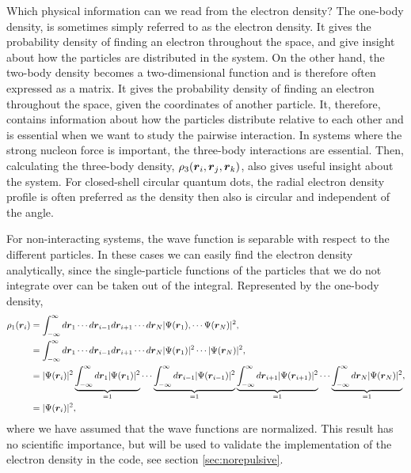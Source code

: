 Which physical information can we read from the electron density? The one-body density, is sometimes simply referred to as the electron density. It gives the probability density of finding an electron throughout the space, and give insight about how the particles are distributed in the system. On the other hand, the two-body density becomes a two-dimensional function and is therefore often expressed as a matrix. It gives the probability density of finding an electron throughout the space, given the coordinates of another particle. It, therefore, contains information about how the particles distribute relative to each other and is essential when we want to study the pairwise interaction. In systems where the strong nucleon force is important, the three-body interactions are essential. Then, calculating the three-body density, $\rho_3(\boldsymbol{{r}}_i, \boldsymbol{{r}}_j, \boldsymbol{{r}}_k)$, also gives useful insight about the system. For closed-shell circular quantum dots, the radial electron density profile is often preferred as the density then also is circular and independent of the angle. 

For non-interacting systems, the wave function is separable with respect to the different particles. In these cases we can easily find the electron density analytically, since the single-particle functions of the particles that we do not integrate over can be taken out of the integral. Represented by the one-body density, 
\begin{equation}
\begin{aligned}
\rho_1(\boldsymbol{{r}}_i)&=\int_{-\infty}^{\infty}d\boldsymbol{{r}}_{1}\cdots d\boldsymbol{{r}}_{i-1}d\boldsymbol{{r}}_{i+1}\cdots d\boldsymbol{{r}}_N |\Psi(\boldsymbol{{r}}_1),\cdots \Psi(\boldsymbol{{r}}_N)|^2,\\
&=\int_{-\infty}^{\infty}d\boldsymbol{{r}}_{1}\cdots d\boldsymbol{{r}}_{i-1}d\boldsymbol{{r}}_{i+1}\cdots d\boldsymbol{{r}}_N |\Psi(\boldsymbol{{r}}_1)|^2\cdots |\Psi(\boldsymbol{{r}}_N)|^2,\\
&=|\Psi(\boldsymbol{{r}}_i)|^2\underbrace{\int_{-\infty}^{\infty}d\boldsymbol{{r}}_{1}|\Psi(\boldsymbol{{r}}_{1})|^2}_{=1}\cdots\underbrace{\int_{-\infty}^{\infty}d\boldsymbol{{r}}_{i-1}|\Psi(\boldsymbol{{r}}_{i-1})|^2}_{=1}\underbrace{\int_{-\infty}^{\infty}d\boldsymbol{{r}}_{i+1}|\Psi(\boldsymbol{{r}}_{i+1})|^2}_{=1}\cdots\underbrace{\int_{-\infty}^{\infty}d\boldsymbol{{r}}_{N}|\Psi(\boldsymbol{{r}}_{N})|^2}_{=1},\\
&=|\Psi(\boldsymbol{{r}}_i)|^2,
\end{aligned}
\end{equation}
where we have assumed that the wave functions are normalized. This result has no scientific importance, but will be used to validate the implementation of the electron density in the code, see section \ref{sec:norepulsive}.

